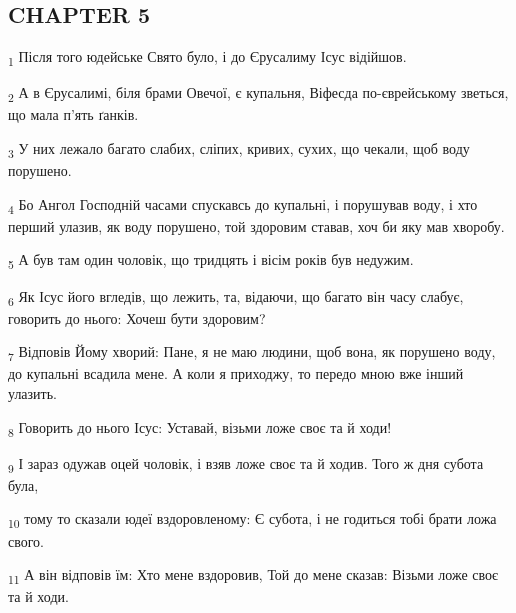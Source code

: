 \subsection{CHAPTER 5}
\begin{tcolorbox}
\textsubscript{1} Після того юдейське Свято було, і до Єрусалиму Ісус відійшов.
\end{tcolorbox}
\begin{tcolorbox}
\textsubscript{2} А в Єрусалимі, біля брами Овечої, є купальня, Віфесда по-єврейському зветься, що мала п'ять ґанків.
\end{tcolorbox}
\begin{tcolorbox}
\textsubscript{3} У них лежало багато слабих, сліпих, кривих, сухих, що чекали, щоб воду порушено.
\end{tcolorbox}
\begin{tcolorbox}
\textsubscript{4} Бо Ангол Господній часами спускавсь до купальні, і порушував воду, і хто перший улазив, як воду порушено, той здоровим ставав, хоч би яку мав хворобу.
\end{tcolorbox}
\begin{tcolorbox}
\textsubscript{5} А був там один чоловік, що тридцять і вісім років був недужим.
\end{tcolorbox}
\begin{tcolorbox}
\textsubscript{6} Як Ісус його вгледів, що лежить, та, відаючи, що багато він часу слабує, говорить до нього: Хочеш бути здоровим?
\end{tcolorbox}
\begin{tcolorbox}
\textsubscript{7} Відповів Йому хворий: Пане, я не маю людини, щоб вона, як порушено воду, до купальні всадила мене. А коли я приходжу, то передо мною вже інший улазить.
\end{tcolorbox}
\begin{tcolorbox}
\textsubscript{8} Говорить до нього Ісус: Уставай, візьми ложе своє та й ходи!
\end{tcolorbox}
\begin{tcolorbox}
\textsubscript{9} І зараз одужав оцей чоловік, і взяв ложе своє та й ходив. Того ж дня субота була,
\end{tcolorbox}
\begin{tcolorbox}
\textsubscript{10} тому то сказали юдеї вздоровленому: Є субота, і не годиться тобі брати ложа свого.
\end{tcolorbox}
\begin{tcolorbox}
\textsubscript{11} А він відповів їм: Хто мене вздоровив, Той до мене сказав: Візьми ложе своє та й ходи.
\end{tcolorbox}
